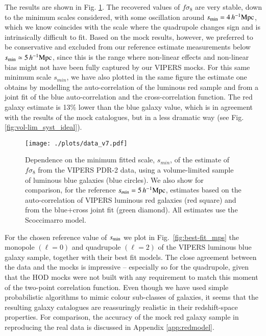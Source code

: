 \documentclass[longauth]{aa}
\def\({\left(}
\def\){\right)}
\def\mhmpc{\,h^{-1}{\rm Mpc}}
\begin{document}
The results are shown in Fig. \ref{fig:fs8_s-min_data}. The recovered values of $f\sigma_8$ are very stable, down to the minimum scales considered, with some oscillation around $s_{\rm{min}}=4\mhmpc$, which we know coincides with the scale where the quadrupole changes sign and is intrinsically difficult to fit. Based on the mock results, however, we preferred to be conservative and excluded from our reference estimate measurements below $s_{\rm{min}}\simeq5\mhmpc$, since this is the range where non-linear effects and non-linear bias might not have been fully captured by our VIPERS mocks. For this same minimum scale $s_{min}$, we have also plotted in the same figure the estimate one obtains by modelling the auto-correlation of the luminous red sample and from a joint fit of the blue auto-correlation and the cross-correlation function. The red galaxy estimate is 13\% lower than the blue galaxy value, which is in agreement with the results of the mock catalogues, but in a less dramatic way (see Fig. \ref{fig:vol-lim_syst_ideal}).
\begin{figure}
	\centering
		\texttt{[image: ./plots/data\_v7.pdf]}
		\caption{Dependence on the minimum fitted scale, $s_{min}$, of the estimate of $f\sigma_8$ from the VIPERS PDR-2 data, using a volume-limited sample of luminous blue galaxies (blue circles). We also show for comparison, for the reference $s_{min}=5\mhmpc$, estimates based on the auto-correlation of VIPERS luminous red galaxies (red square) and from the blue+cross joint fit (green diamond). All estimates use the Scoccimarro model.} \label{fig:fs8_s-min_data}
	\end{figure}
For the chosen reference value of $s_{\rm{min}}$ we plot in Fig.~\ref{fig:best-fit_mps}  the monopole $\(\ell=0\)$ and quadrupole $\(\ell=2\)$ of the VIPERS luminous blue galaxy sample, together with their best fit models. The close agreement between the data and the mocks is impressive -- especially so for the quadrupole, given that the HOD mocks were not built with any requirement to match this moment of the two-point correlation function.  Even though we have used simple probabilistic algorithms to mimic colour sub-classes of galaxies, it seems that the resulting galaxy catalogues are reassuringly realistic in their redshift-space properties.  For comparison, the accuracy of the mock red galaxy sample in reproducing the real data is discussed in Appendix \ref{app:redmodel}.
\end{document}
